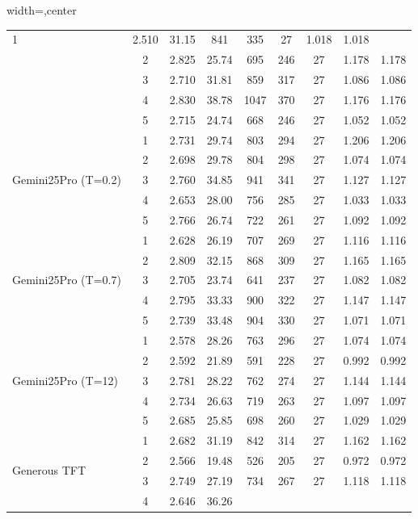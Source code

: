 \begin{table}[htbp]
\begin{adjustbox}{width=\textwidth,center}
\begin{tabular}{|l|c|c|c|c|c|c|c|c|}
1 & 
2.510 & 
31.15 & 
841 & 
335 & 
27 & 
1.018 & 
1.018 \\
 & 
2 & 
2.825 & 
25.74 & 
695 & 
246 & 
27 & 
1.178 & 
1.178 \\
 & 
3 & 
2.710 & 
31.81 & 
859 & 
317 & 
27 & 
1.086 & 
1.086 \\
 & 
4 & 
2.830 & 
38.78 & 
1047 & 
370 & 
27 & 
1.176 & 
1.176 \\
 & 
5 & 
2.715 & 
24.74 & 
668 & 
246 & 
27 & 
1.052 & 
1.052 \\
\hline
\multirow{5}{*}{Gemini25Pro (T=0.2)} & 
1 & 
2.731 & 
29.74 & 
803 & 
294 & 
27 & 
1.206 & 
1.206 \\
 & 
2 & 
2.698 & 
29.78 & 
804 & 
298 & 
27 & 
1.074 & 
1.074 \\
 & 
3 & 
2.760 & 
34.85 & 
941 & 
341 & 
27 & 
1.127 & 
1.127 \\
 & 
4 & 
2.653 & 
28.00 & 
756 & 
285 & 
27 & 
1.033 & 
1.033 \\
 & 
5 & 
2.766 & 
26.74 & 
722 & 
261 & 
27 & 
1.092 & 
1.092 \\
\hline
\multirow{5}{*}{Gemini25Pro (T=0.7)} & 
1 & 
2.628 & 
26.19 & 
707 & 
269 & 
27 & 
1.116 & 
1.116 \\
 & 
2 & 
2.809 & 
32.15 & 
868 & 
309 & 
27 & 
1.165 & 
1.165 \\
 & 
3 & 
2.705 & 
23.74 & 
641 & 
237 & 
27 & 
1.082 & 
1.082 \\
 & 
4 & 
2.795 & 
33.33 & 
900 & 
322 & 
27 & 
1.147 & 
1.147 \\
 & 
5 & 
2.739 & 
33.48 & 
904 & 
330 & 
27 & 
1.071 & 
1.071 \\
\hline
\multirow{5}{*}{Gemini25Pro (T=12)} & 
1 & 
2.578 & 
28.26 & 
763 & 
296 & 
27 & 
1.074 & 
1.074 \\
 & 
2 & 
2.592 & 
21.89 & 
591 & 
228 & 
27 & 
0.992 & 
0.992 \\
 & 
3 & 
2.781 & 
28.22 & 
762 & 
274 & 
27 & 
1.144 & 
1.144 \\
 & 
4 & 
2.734 & 
26.63 & 
719 & 
263 & 
27 & 
1.097 & 
1.097 \\
 & 
5 & 
2.685 & 
25.85 & 
698 & 
260 & 
27 & 
1.029 & 
1.029 \\
\hline
\multirow{5}{*}{Generous TFT} & 
1 & 
2.682 & 
31.19 & 
842 & 
314 & 
27 & 
1.162 & 
1.162 \\
 & 
2 & 
2.566 & 
19.48 & 
526 & 
205 & 
27 & 
0.972 & 
0.972 \\
 & 
3 & 
2.749 & 
27.19 & 
734 & 
267 & 
27 & 
1.118 & 
1.118 \\
 & 
4 & 
2.646 & 
36.26 & 

\end{tabular}
\end{adjustbox}
\end{table}
